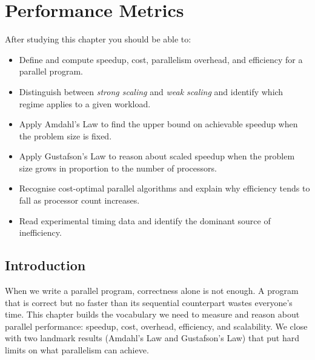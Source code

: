 

\chapter{Performance Metrics}

\begin{ppkey}
After studying this chapter you should be able to:
\begin{itemize}
  \item Define and compute speedup, cost, parallelism overhead, and efficiency
        for a parallel program.
  \item Distinguish between \emph{strong scaling} and \emph{weak scaling} and
        identify which regime applies to a given workload.
  \item Apply Amdahl's Law to find the upper bound on achievable speedup when
        the problem size is fixed.
  \item Apply Gustafson's Law to reason about scaled speedup when the problem
        size grows in proportion to the number of processors.
  \item Recognise cost-optimal parallel algorithms and explain why efficiency
        tends to fall as processor count increases.
  \item Read experimental timing data and identify the dominant source of
        inefficiency.
\end{itemize}
\end{ppkey}

\section{Introduction}

When we write a parallel program, correctness alone is not enough.
A program that is correct but no faster than its sequential counterpart
wastes everyone's time.
This chapter builds the vocabulary we need to measure and reason about
parallel performance: speedup, cost, overhead, efficiency, and scalability.
We close with two landmark results (Amdahl's Law and Gustafson's Law) that
put hard limits on what parallelism can achieve.

